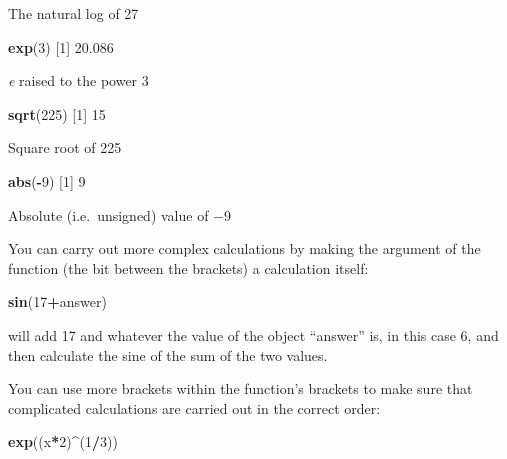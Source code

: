 \documentclass[
]{book}
\newenvironment{Shaded}{\begin{snugshade}}{\end{snugshade}}
\newcommand{\DecValTok}[1]{\textcolor[rgb]{0.00,0.00,0.81}{#1}}
\newcommand{\FloatTok}[1]{\textcolor[rgb]{0.00,0.00,0.81}{#1}}
\newcommand{\KeywordTok}[1]{\textcolor[rgb]{0.13,0.29,0.53}{\textbf{#1}}}
\newcommand{\NormalTok}[1]{#1}
\newcommand{\OperatorTok}[1]{\textcolor[rgb]{0.81,0.36,0.00}{\textbf{#1}}}
\begin{document}
The natural log of 27

\begin{Shaded}
\begin{Highlighting}[]
\KeywordTok{exp}\NormalTok{(}\DecValTok{3}\NormalTok{)}
\NormalTok{[}\DecValTok{1}\NormalTok{] }\FloatTok{20.086}
\end{Highlighting}
\end{Shaded}

\emph{e} raised to the power 3

\begin{Shaded}
\begin{Highlighting}[]
\KeywordTok{sqrt}\NormalTok{(}\DecValTok{225}\NormalTok{)}
\NormalTok{[}\DecValTok{1}\NormalTok{] }\DecValTok{15}
\end{Highlighting}
\end{Shaded}

Square root of 225

\begin{Shaded}
\begin{Highlighting}[]
\KeywordTok{abs}\NormalTok{(}\OperatorTok{-}\DecValTok{9}\NormalTok{)}
\NormalTok{[}\DecValTok{1}\NormalTok{] }\DecValTok{9}
\end{Highlighting}
\end{Shaded}

Absolute (i.e.~unsigned) value of −9

You can carry out more complex calculations by making the argument of the function (the bit between the brackets) a calculation itself:

\begin{Shaded}
\begin{Highlighting}[]
\KeywordTok{sin}\NormalTok{(}\DecValTok{17}\OperatorTok{+}\NormalTok{answer)}
\end{Highlighting}
\end{Shaded}

will add 17 and whatever the value of the object ``answer'' is, in this case 6, and then calculate the sine of the sum of the two values.

You can use more brackets within the function's brackets to make sure that complicated calculations are carried out in the correct order:

\begin{Shaded}
\begin{Highlighting}[]
\KeywordTok{exp}\NormalTok{((x}\OperatorTok{*}\DecValTok{2}\NormalTok{)}\OperatorTok{^}\NormalTok{(}\DecValTok{1}\OperatorTok{/}\DecValTok{3}\NormalTok{))}
\end{Highlighting}
\end{Shaded}
\end{document}
